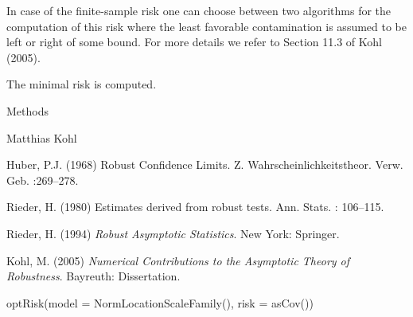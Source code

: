 \begin{Details}\relax
In case of the finite-sample risk  one can choose
between two algorithms for the computation of this risk where the least favorable
contamination is assumed to be left or right of some bound. For more details
we refer to Section 11.3 of Kohl (2005).
\end{Details}
\begin{Value}
The minimal risk is computed.
\end{Value}
\begin{Section}{Methods}
\end{Section}
\begin{Author}\relax
Matthias Kohl 
\end{Author}
\begin{References}\relax
Huber, P.J. (1968) Robust Confidence Limits. Z. Wahrscheinlichkeitstheor.
Verw. Geb. :269--278.

Rieder, H. (1980) Estimates derived from robust tests. Ann. Stats. : 106--115.

Rieder, H. (1994) \emph{Robust Asymptotic Statistics}. New York: Springer.

Kohl, M. (2005) \emph{Numerical Contributions to the Asymptotic Theory of Robustness}. 
Bayreuth: Dissertation.
\end{References}
\begin{SeeAlso}\relax
{}
\end{SeeAlso}
\begin{Examples}
\begin{ExampleCode}
optRisk(model = NormLocationScaleFamily(), risk = asCov())
\end{ExampleCode}
\end{Examples}

